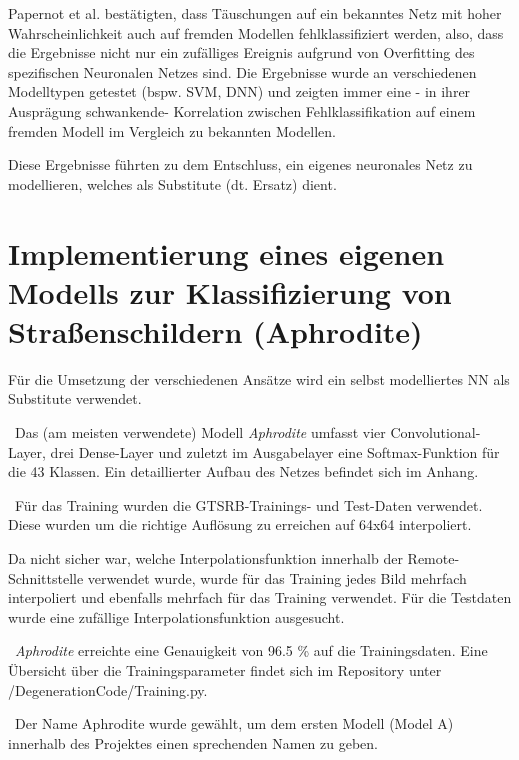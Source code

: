 Papernot et al.\cite{papernot_+_2016} bestätigten, dass Täuschungen auf ein bekanntes Netz mit hoher Wahrscheinlichkeit auch auf fremden Modellen fehlklassifiziert werden, also, dass die Ergebnisse nicht nur ein zufälliges Ereignis aufgrund von Overfitting des spezifischen Neuronalen Netzes sind. Die Ergebnisse wurde an verschiedenen Modelltypen getestet (bspw. \ac{SVM}, \ac{DNN}) und zeigten immer eine - in ihrer Ausprägung schwankende- Korrelation zwischen Fehlklassifikation auf einem fremden Modell im Vergleich zu bekannten Modellen. 


Diese Ergebnisse führten zu dem Entschluss, ein eigenes neuronales Netz zu modellieren, welches als Substitute (dt. Ersatz) dient.


\section{Implementierung eines eigenen Modells zur Klassifizierung von Straßenschildern (Aphrodite)}
Für die Umsetzung der verschiedenen Ansätze wird ein selbst modelliertes \ac{NN} als Substitute verwendet.

~\newline Das (am meisten verwendete) Modell \textit{Aphrodite} umfasst vier Convolutional-Layer, drei Dense-Layer und zuletzt im Ausgabelayer eine Softmax-Funktion für die 43 Klassen. Ein detaillierter Aufbau des Netzes befindet sich im Anhang.

~\newline Für das Training wurden die \ac{GTSRB}-Trainings- und Test-Daten verwendet. Diese wurden um die richtige Auflösung zu erreichen auf 64x64 interpoliert. 

Da nicht sicher war, welche Interpolationsfunktion innerhalb der Remote-Schnittstelle verwendet wurde, wurde für das Training jedes Bild mehrfach interpoliert und ebenfalls mehrfach für das Training verwendet. Für die Testdaten wurde eine zufällige Interpolationsfunktion ausgesucht. 

~\newline \textit{Aphrodite} erreichte eine Genauigkeit von 96.5 \% auf die Trainingsdaten. Eine Übersicht über die Trainingsparameter findet sich im Repository unter /DegenerationCode/Training.py. 

~\newline Der Name Aphrodite wurde gewählt, um dem ersten Modell (Model A) innerhalb des Projektes einen sprechenden Namen zu geben.
